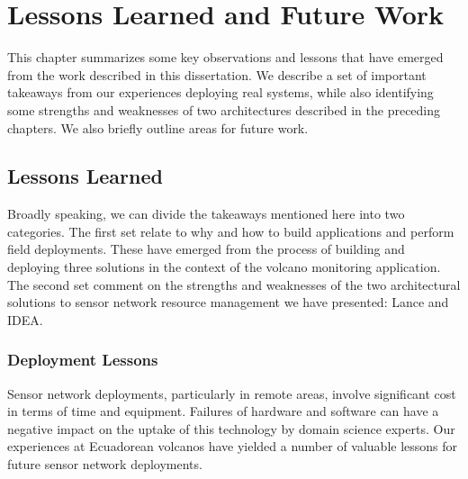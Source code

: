 \chapter{Lessons Learned and Future Work}
\label{chapter-lessons}

This chapter summarizes some key observations and lessons that have emerged
from the work described in this dissertation. We describe a set of important
takeaways from our experiences deploying real systems, while also identifying
some strengths and weaknesses of two architectures described in the preceding
chapters. We also briefly outline areas for future work.

\section{Lessons Learned}

Broadly speaking, we can divide the takeaways mentioned here into two
categories. The first set relate to why and how to build applications and
perform field deployments. These have emerged from the process of building
and deploying three solutions in the context of the volcano monitoring
application. The second set comment on the strengths and weaknesses of the
two architectural solutions to sensor network resource management we have
presented: Lance and IDEA.

\subsection{Deployment Lessons}

Sensor network deployments, particularly in remote areas, involve significant
cost in terms of time and equipment. Failures of hardware and software can
have a negative impact on the uptake of this technology by domain science
experts. Our experiences at Ecuadorean volcanos have yielded a number of
valuable lessons for future sensor network deployments. 

